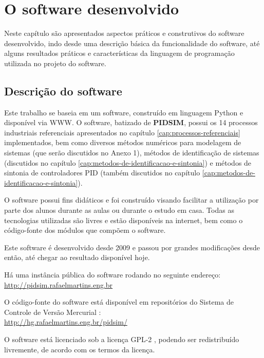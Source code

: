 \chapter{O software desenvolvido \label{cap:software}}

Neste capítulo são apresentados aspectos práticos e construtivos do
software desenvolvido, indo desde uma descrição básica da funcionalidade
do software, até alguns resultados práticos e características da linguagem
de programação utilizada no projeto do software.

\section{Descrição do software}

    Este trabalho se baseia em um software, construído em linguagem Python
    e disponível via \ac{WWW}. O software, batizado de \textbf{PIDSIM},
    possui os 14 processos industriais referenciais apresentados no capítulo
    \ref{cap:processos-referenciais} implementados, bem como diversos
    métodos numéricos para modelagem de sistemas (que serão discutidos no
    Anexo 1), métodos de identificação de sistemas (discutidos no capítulo
    \ref{cap:metodos-de-identificacao-e-sintonia}) e métodos de sintonia de
    controladores \acs{PID} (também discutidos no capítulo
    \ref{cap:metodos-de-identificacao-e-sintonia}).

    O software possui fins didáticos e foi construído visando facilitar a
    utilização por parte dos alunos durante as aulas ou durante o estudo em casa.
    Todas as tecnologias utilizadas são livres e estão disponíveis na internet,
    bem como o código-fonte dos módulos que compõem o software.

    Este software é desenvolvido desde 2009 e passou por grandes modificações
    desde então, até chegar ao resultado disponível hoje.

    Há uma instância pública do software rodando no seguinte endereço: \\
    \url{http://pidsim.rafaelmartins.eng.br}

    O código-fonte do software está disponível em repositórios do Sistema
    de Controle de Versão Mercurial \cite{Mercurial}: \\
    \url{http://hg.rafaelmartins.eng.br/pidsim/}

    O software está licenciado sob a licença \ac{GPL-2} \cite{GPL-2}, podendo ser redistribuído
    livremente, de acordo com os termos da licença.

